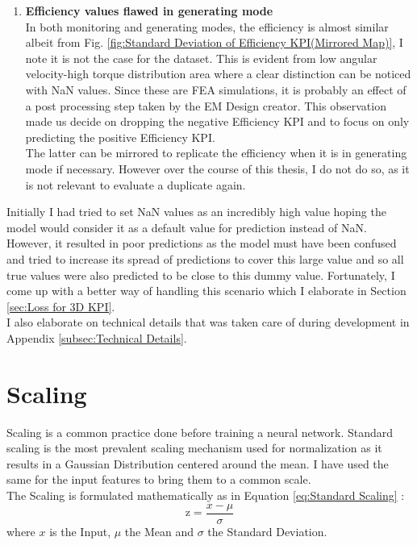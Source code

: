 \documentclass{report} %
\begin{document}
\begin{enumerate}[nosep]
    \item \textbf{Efficiency values flawed in generating mode}\\
    In both monitoring and generating modes, the efficiency is almost similar albeit from Fig. \ref{fig:Standard Deviation of Efficiency KPI(Mirrored Map)}, 
    I note it is not the case for the dataset. This is evident from low angular velocity-high torque distribution area where a clear distinction can be noticed with 
    \ac{NaN} values. Since these are \ac{FEA} simulations, it is probably an effect of a post processing step taken by the EM Design creator.
    This observation made us decide on dropping the negative Efficiency \ac{KPI} and to focus on only predicting the positive Efficiency \ac{KPI}.\\
    The latter can be mirrored to replicate the efficiency when it is in generating mode if necessary.
    However over the course of this thesis, I do not do so, as it is not relevant to evaluate a duplicate again.\\
\end{enumerate}

Initially I had tried to set \ac{NaN} values as an incredibly high value hoping the model would consider it as a default value for prediction instead of \ac{NaN}.
However, it resulted in poor predictions as the model must have been confused and tried to increase its spread of predictions to cover this large value and so all 
true values were also predicted to be close to this dummy value.
Fortunately, I come up with a better way of handling this scenario which I elaborate in Section \ref{sec:Loss for 3D KPI}.\\
I also elaborate on technical details that was taken care of during development in Appendix \ref{subsec:Technical Details}. 

\section{Scaling}\label{sec:Scaling}

Scaling is a common practice done before training a neural network. 
Standard scaling is the most prevalent scaling mechanism used for normalization as it results in a Gaussian Distribution centered around the mean.
I have used the same for the input features to bring them to a common scale. \\

The Scaling is formulated mathematically as in Equation \ref{eq:Standard Scaling} :
\begin{equation}
    \text{z} = \frac{x - \mu}{\sigma}
    \label{eq:Standard Scaling}
\end{equation} 
where $x$ is the Input, $\mu$ the Mean and $\sigma$ the Standard Deviation.\\
\end{document}
